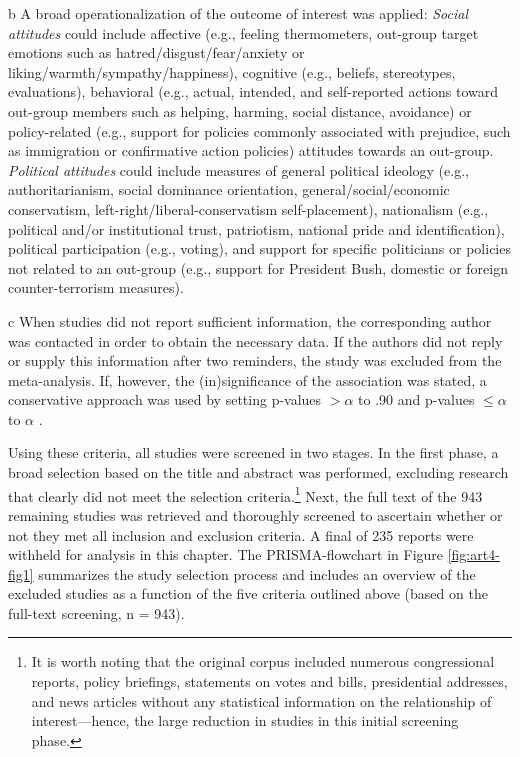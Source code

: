 \begin{table}[H]
\begin{threeparttable}
\begin{tablenotes}
\item[b] A broad operationalization of the outcome of interest was applied: \textit{Social attitudes} could include affective (e.g., feeling thermometers, out-group target emotions such as hatred/disgust/fear/anxiety or liking/warmth/sympathy/happiness), cognitive (e.g., beliefs, stereotypes, evaluations), behavioral (e.g., actual, intended, and self-reported actions toward out-group members such as helping, harming, social distance, avoidance) or policy-related (e.g., support for policies commonly associated with prejudice, such as immigration or confirmative action policies) attitudes towards an out-group. \textit{Political attitudes} could include measures of general political ideology (e.g., authoritarianism, social dominance orientation, general/social/economic conservatism, left-right/liberal-conservatism self-placement), nationalism (e.g., political and/or institutional trust, patriotism, national pride and identification), political participation (e.g., voting), and support for specific politicians or policies not related to an out-group (e.g., support for President Bush, domestic or foreign counter-terrorism measures).
\item[c] When studies did not report sufficient information, the corresponding author was contacted in order to obtain the necessary data. If the authors did not reply or supply this information after two reminders, the study was excluded from the meta-analysis. If, however, the (in)significance of the association was stated, a conservative approach was used by setting p-values $> \alpha$ to .90 and p-values $\leq \alpha$ to $\alpha$ .
\end{tablenotes}
\end{threeparttable}
\end{table}


Using these criteria, all studies were screened in two stages. In the first phase, a broad selection based on the title and abstract was performed, excluding research that clearly did not meet the selection criteria.\footnote{It is worth noting that the original corpus included numerous congressional reports, policy briefings, statements on votes and bills, presidential addresses, and news articles without any statistical information on the relationship of interest---hence, the large reduction in studies in this initial screening phase.} Next, the full text of the 943 remaining studies was retrieved and thoroughly screened to ascertain whether or not they met all inclusion and exclusion criteria. A final of 235 reports were withheld for analysis in this chapter. The PRISMA-flowchart in Figure \ref{fig:art4-fig1} summarizes the study selection process and includes an overview of the excluded studies as a function of the five criteria outlined above (based on the full-text screening, n = 943).

